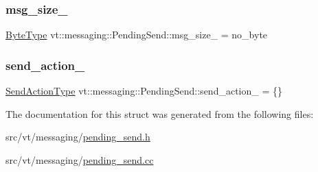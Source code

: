 \subsubsection{\texorpdfstring{msg\+\_\+size\+\_\+}{msg\_size\_}}
{\footnotesize\ttfamily \hyperlink{namespacevt_aab8d55968084610ce3b17057981e9300}{Byte\+Type} vt\+::messaging\+::\+Pending\+Send\+::msg\+\_\+size\+\_\+ = no\+\_\+byte\hspace{0.3cm}{\ttfamily [private]}}

\mbox{\label{structvt_1_1messaging_1_1_pending_send_a0054d2fec8353438284dc02a28a73294}} 
\subsubsection{\texorpdfstring{send\+\_\+action\+\_\+}{send\_action\_}}
{\footnotesize\ttfamily \hyperlink{structvt_1_1messaging_1_1_pending_send_aa13248a342d68230048cde8e0756851c}{Send\+Action\+Type} vt\+::messaging\+::\+Pending\+Send\+::send\+\_\+action\+\_\+ = \{\}\hspace{0.3cm}{\ttfamily [private]}}



The documentation for this struct was generated from the following files\+:\begin{DoxyCompactItemize}
\item 
src/vt/messaging/\hyperlink{pending__send_8h}{pending\+\_\+send.\+h}\item 
src/vt/messaging/\hyperlink{pending__send_8cc}{pending\+\_\+send.\+cc}\end{DoxyCompactItemize}
